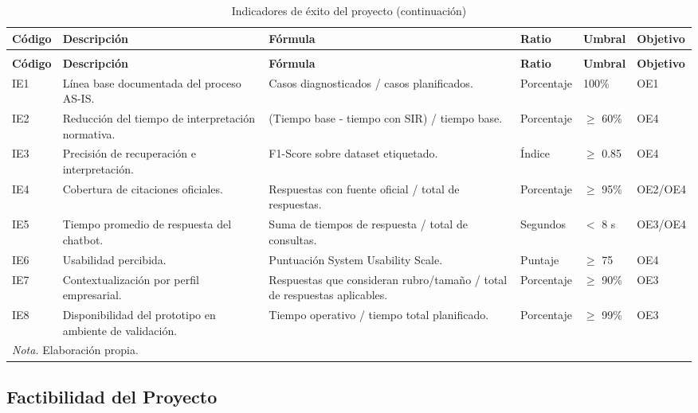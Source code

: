 \documentclass[12pt,a4paper,oneside]{report}
\begin{document}
\begin{longtable}{@{}p{}p{}p{}p{}p{}p{}@{}}
\caption{Indicadores de éxito del proyecto}\label{tab:indicadores-exito-reformulados}\\
\toprule
\textbf{Código} & \textbf{Descripción} & \textbf{Fórmula} & \textbf{Ratio} & \textbf{Umbral} & \textbf{Objetivo} \\
\midrule
\endfirsthead
\caption[]{Indicadores de éxito del proyecto (continuación)}\\
\toprule
\textbf{Código} & \textbf{Descripción} & \textbf{Fórmula} & \textbf{Ratio} & \textbf{Umbral} & \textbf{Objetivo} \\
\midrule
\endhead
IE1 & Línea base documentada del proceso AS-IS. & Casos diagnosticados / casos planificados. & Porcentaje & 100\% & OE1 \\
IE2 & Reducción del tiempo de interpretación normativa. & (Tiempo base - tiempo con SIR) / tiempo base. & Porcentaje & $\geq$ 60\% & OE4 \\
IE3 & Precisión de recuperación e interpretación. & F1-Score sobre dataset etiquetado. & Índice & $\geq$ 0.85 & OE4 \\
IE4 & Cobertura de citaciones oficiales. & Respuestas con fuente oficial / total de respuestas. & Porcentaje & $\geq$ 95\% & OE2/OE4 \\
IE5 & Tiempo promedio de respuesta del chatbot. & Suma de tiempos de respuesta / total de consultas. & Segundos & $<$ 8 s & OE3/OE4 \\
IE6 & Usabilidad percibida. & Puntuación System Usability Scale. & Puntaje & $\geq$ 75 & OE4 \\
IE7 & Contextualización por perfil empresarial. & Respuestas que consideran rubro/tamaño / total de respuestas aplicables. & Porcentaje & $\geq$ 90\% & OE3 \\
IE8 & Disponibilidad del prototipo en ambiente de validación. & Tiempo operativo / tiempo total planificado. & Porcentaje & $\geq$ 99\% & OE3 \\
\bottomrule
\multicolumn{6}{p{0.94\textwidth}}{\normalsize \textit{Nota.} Elaboración propia.}\\
\end{longtable}

\subsection{Factibilidad del Proyecto}\label{subsec:factibilidad-del-proyecto}
\end{document}
